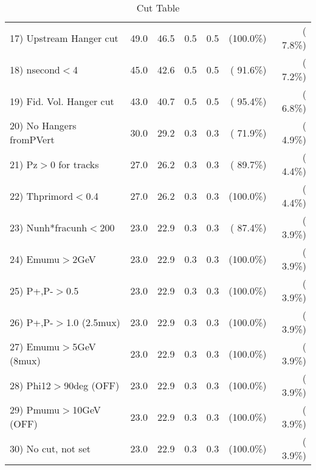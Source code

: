 \begin{table}[h!]
\begin{tabular}{||l||r|r|r|r|r|r||}
 17) Upstream Hanger cut  &         49.0 &         46.5 &          0.5 &          0.5 & (100.0\%) & (  7.8\%) \\
 18) nsecond$<$4          &         45.0 &         42.6 &          0.5 &          0.5 & ( 91.6\%) & (  7.2\%) \\
 19) Fid. Vol. Hanger cut &         43.0 &         40.7 &          0.5 &          0.5 & ( 95.4\%) & (  6.8\%) \\
 20) No Hangers fromPVert &         30.0 &         29.2 &          0.3 &          0.3 & ( 71.9\%) & (  4.9\%) \\
 21) Pz$>$0 for tracks    &         27.0 &         26.2 &          0.3 &          0.3 & ( 89.7\%) & (  4.4\%) \\
 22) Thprimord$<$0.4      &         27.0 &         26.2 &          0.3 &          0.3 & (100.0\%) & (  4.4\%) \\
 23) Nunh*fracunh$<$200   &         23.0 &         22.9 &          0.3 &          0.3 & ( 87.4\%) & (  3.9\%) \\
 24) Emumu$>$2GeV         &         23.0 &         22.9 &          0.3 &          0.3 & (100.0\%) & (  3.9\%) \\
 25) P+,P-$>$0.5          &         23.0 &         22.9 &          0.3 &          0.3 & (100.0\%) & (  3.9\%) \\
 26) P+,P-$>$1.0 (2.5mux) &         23.0 &         22.9 &          0.3 &          0.3 & (100.0\%) & (  3.9\%) \\
 27) Emumu$>$5GeV  (8mux) &         23.0 &         22.9 &          0.3 &          0.3 & (100.0\%) & (  3.9\%) \\
 28) Phi12$>$90deg  (OFF) &         23.0 &         22.9 &          0.3 &          0.3 & (100.0\%) & (  3.9\%) \\
 29) Pmumu$>$10GeV  (OFF) &         23.0 &         22.9 &          0.3 &          0.3 & (100.0\%) & (  3.9\%) \\
 30) No cut, not set      &         23.0 &         22.9 &          0.3 &          0.3 & (100.0\%) & (  3.9\%) \\
 \hline
 \hline
 \end{tabular}
 \caption{Cut Table           }
 \label{tab-cutcohjpsi-mumu_anuecc}
 \end{table}
